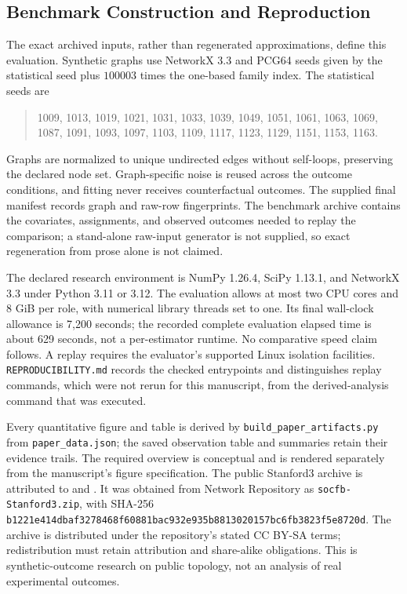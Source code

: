\documentclass{article}
\begin{document}
\subsection{Benchmark Construction and Reproduction}
The exact archived inputs, rather than regenerated approximations, define this evaluation. Synthetic graphs use NetworkX 3.3 and PCG64 seeds given by the statistical seed plus $100003$ times the one-based family index. The statistical seeds are
\begin{quote}\small
1009, 1013, 1019, 1021, 1031, 1033, 1039, 1049, 1051, 1061, 1063, 1069, 1087, 1091, 1093, 1097, 1103, 1109, 1117, 1123, 1129, 1151, 1153, 1163.
\end{quote}
Graphs are normalized to unique undirected edges without self-loops, preserving the declared node set. Graph-specific noise is reused across the outcome conditions, and fitting never receives counterfactual outcomes. The supplied final manifest records graph and raw-row fingerprints. The benchmark archive contains the covariates, assignments, and observed outcomes needed to replay the comparison; a stand-alone raw-input generator is not supplied, so exact regeneration from prose alone is not claimed.

The declared research environment is NumPy 1.26.4, SciPy 1.13.1, and NetworkX 3.3 under Python 3.11 or 3.12. The evaluation allows at most two CPU cores and 8 GiB per role, with numerical library threads set to one. Its final wall-clock allowance is 7,200 seconds; the recorded complete evaluation elapsed time is about 629 seconds, not a per-estimator runtime. No comparative speed claim follows. A replay requires the evaluator's supported Linux isolation facilities. \texttt{REPRODUCIBILITY.md} records the checked entrypoints and distinguishes replay commands, which were not rerun for this manuscript, from the derived-analysis command that was executed.

Every quantitative figure and table is derived by \texttt{build\_paper\_artifacts.py} from \texttt{paper\_data.json}; the saved observation table and summaries retain their evidence trails. The required overview is conceptual and is rendered separately from the manuscript's figure specification. The public Stanford3 archive is attributed to \citet{Traud2012} and \citet{Rossi2015}. It was obtained from Network Repository as \texttt{socfb-Stanford3.zip}, with SHA-256 \texttt{b1221e414dbaf3278468f60881bac932e935b8813020157bc6fb3823f5e8720d}. The archive is distributed under the repository's stated CC BY-SA terms; redistribution must retain attribution and share-alike obligations. This is synthetic-outcome research on public topology, not an analysis of real experimental outcomes.
\end{document}

